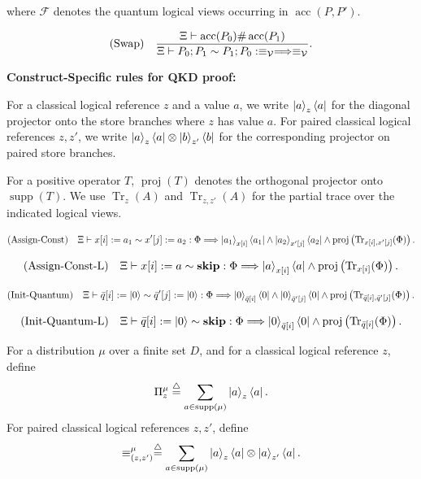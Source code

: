 \documentclass[acmsmall,screen,review,anonymous,nonacm]{acmart}
\theoremstyle{defn_style}
\begin{document}
where \(\mathcal F\) denotes the quantum logical views occurring in
\(\operatorname{acc}(P,P')\).

\[
\text{\rm (Swap)}
\quad
\frac{
\Xi\vdash
\operatorname{acc}(P_0)\#
\operatorname{acc}(P_1)
}{
\Xi
\vdash
P_0;P_1
\sim
P_1;P_0
:
\equiv_{\mathcal V}
\Longrightarrow
\equiv_{\mathcal V}
}.
\]



\textbf{Construct-Specific rules for QKD proof:}

For a classical logical reference \(z\) and a value \(a\), we write
\(\ket a_z\bra a\)
for the diagonal projector onto the store branches where \(z\) has value \(a\).
For paired classical logical references \(z,z'\), we write
\(\ket a_z\bra a\otimes\ket b_{z'}\bra b\)
for the corresponding projector on paired store branches.

For a positive operator \(T\), \(\operatorname{proj}(T)\) denotes the
orthogonal projector onto \(\operatorname{supp}(T)\). We use
\(\operatorname{Tr}_{z}(A)\) and \(\operatorname{Tr}_{z,z'}(A)\) for the
partial trace over the indicated logical views.

\[
\text{\rm (Assign-Const)}
\quad
\Xi
\vdash
x[i]:=a_1
\sim
x'[j]:=a_2
:
\Phi
\Longrightarrow
\ket{a_1}_{x[i]}\bra{a_1}
\land
\ket{a_2}_{x'[j]}\bra{a_2}
\land
\operatorname{proj}
\left(
\operatorname{Tr}_{x[i],x'[j]}(\Phi)
\right).
\]

\[
\text{\rm (Assign-Const-L)}
\quad
\Xi
\vdash
x[i]:=a
\sim
\mathbf{skip}
:
\Phi
\Longrightarrow
\ket a_{x[i]}\bra a
\land
\operatorname{proj}
\left(
\operatorname{Tr}_{x[i]}(\Phi)
\right).
\]

\[
\text{\rm (Init-Quantum)}
\quad
\Xi
\vdash
\bar q[i]:=\ket 0
\sim
\bar q'[j]:=\ket 0
:
\Phi
\Longrightarrow
\ket 0_{\bar q[i]}\bra 0
\land
\ket 0_{\bar q'[j]}\bra 0
\land
\operatorname{proj}
\left(
\operatorname{Tr}_{\bar q[i],\bar q'[j]}(\Phi)
\right).
\]

\[
\text{\rm (Init-Quantum-L)}
\quad
\Xi
\vdash
\bar q[i]:=\ket 0
\sim
\mathbf{skip}
:
\Phi
\Longrightarrow
\ket 0_{\bar q[i]}\bra 0
\land
\operatorname{proj}
\left(
\operatorname{Tr}_{\bar q[i]}(\Phi)
\right).
\]



For a distribution \(\mu\) over a finite set \(D\), and for a classical
logical reference \(z\), define
\[
\Pi_z^\mu
\stackrel{\triangle}{=}
\sum_{a\in\operatorname{supp}(\mu)}
\ket a_z\bra a .
\]
For paired classical logical references \(z,z'\), define
\[
\equiv^\mu_{(z,z')}
\stackrel{\triangle}{=}
\sum_{a\in\operatorname{supp}(\mu)}
\ket a_z\bra a
\otimes
\ket a_{z'}\bra a .
\]
\end{document}
